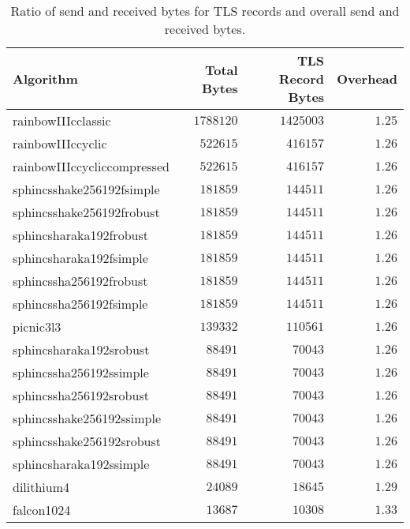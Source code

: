 \begin{table}[ht]
    \begin{center}
        \caption{Ratio of send and received bytes for TLS records and overall send and received bytes.}     
        \begin{tabular}{lrrr}
            \hline
        \textbf{Algorithm} & \textbf{Total Bytes} & \textbf{TLS Record Bytes} & \textbf{Overhead}  \\
        \hline
        rainbowIIIcclassic & \(1788120\) & \(1425003\) & \(1.25\) \\
        \hline
        rainbowIIIccyclic & \(522615\) & \(416157\) & \(1.26\) \\
        \hline
        rainbowIIIccycliccompressed & \(522615\) & \(416157\) & \(1.26\) \\
        \hline
        sphincsshake256192fsimple & \(181859\) & \(144511\) & \(1.26\) \\
        \hline
        sphincsshake256192frobust & \(181859\) & \(144511\) & \(1.26\) \\
        \hline
        sphincsharaka192frobust & \(181859\) & \(144511\) & \(1.26\) \\
        \hline
        sphincsharaka192fsimple & \(181859\) & \(144511\) & \(1.26\) \\
        \hline
        sphincssha256192frobust & \(181859\) & \(144511\) & \(1.26\) \\
        \hline
        sphincssha256192fsimple & \(181859\) & \(144511\) & \(1.26\) \\
        \hline
        picnic3l3 & \(139332\) & \(110561\) & \(1.26\) \\
        \hline
        sphincsharaka192srobust & \(88491\) & \(70043\) & \(1.26\) \\
        \hline
        sphincssha256192ssimple & \(88491\) & \(70043\) & \(1.26\) \\
        \hline
        sphincssha256192srobust & \(88491\) & \(70043\) & \(1.26\) \\
        \hline
        sphincsshake256192ssimple & \(88491\) & \(70043\) & \(1.26\) \\
        \hline
        sphincsshake256192srobust & \(88491\) & \(70043\) & \(1.26\) \\
        \hline
        sphincsharaka192ssimple & \(88491\) & \(70043\) & \(1.26\) \\
        \hline
        dilithium4 & \(24089\) & \(18645\) & \(1.29\) \\
        \hline
        falcon1024 & \(13687\) & \(10308\) & \(1.33\) \\
        \hline
        \end{tabular}
        \label{table:overhead_tls_total}
    \end{center}
\end{table}

